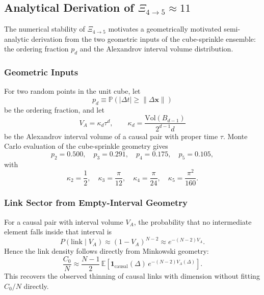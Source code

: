 \documentclass[12pt,a4paper]{article}
\begin{document}
\subsection{Analytical Derivation of $\Xi_{4 \to 5} \approx 11$}
\label{sec:xi_derivation}

The numerical stability of $\Xi_{4 \to 5}$ motivates a geometrically motivated
semi-analytic derivation from the two geometric inputs of the cube-sprinkle ensemble:
the ordering fraction $p_d$ and the Alexandrov interval volume distribution.

\subsubsection{Geometric Inputs}
\label{sec:scaling_laws}

For two random points in the unit cube, let
\begin{equation}
p_d \equiv \mathbb{P}(|\Delta t| \geq \|\Delta \mathbf{x}\|)
\end{equation}
be the ordering fraction, and let
\begin{equation}
V_A = \kappa_d \tau^d,
\qquad
\kappa_d = \frac{\mathrm{Vol}(B_{d-1})}{2^{d-1}d}
\end{equation}
be the Alexandrov interval volume of a causal pair with proper time $\tau$.
Monte Carlo evaluation of the cube-sprinkle geometry gives
\begin{equation}
p_2 = 0.500, \quad p_3 = 0.291, \quad p_4 = 0.175, \quad p_5 = 0.105,
\end{equation}
with
\begin{equation}
\kappa_2 = \frac{1}{2}, \quad
\kappa_3 = \frac{\pi}{12}, \quad
\kappa_4 = \frac{\pi}{24}, \quad
\kappa_5 = \frac{\pi^2}{160}.
\end{equation}

\subsubsection{Link Sector from Empty-Interval Geometry}
\label{sec:closed_form}

For a causal pair with interval volume $V_A$, the probability that no
intermediate element falls inside that interval is
\begin{equation}
P(\mathrm{link}\mid V_A) \approx (1-V_A)^{N-2}
\approx e^{-(N-2)V_A}.
\end{equation}
Hence the link density follows directly from Minkowski geometry:
\begin{equation}
\frac{C_0}{N}
\approx
\frac{N-1}{2}\,
\mathbb{E}\!\left[
\mathbf{1}_{\mathrm{causal}}(\Delta)\,
e^{-(N-2)V_A(\Delta)}
\right].
\label{eq:link_geom_density}
\end{equation}
This recovers the observed thinning of causal links with dimension without fitting
$C_0/N$ directly.
\end{document}
